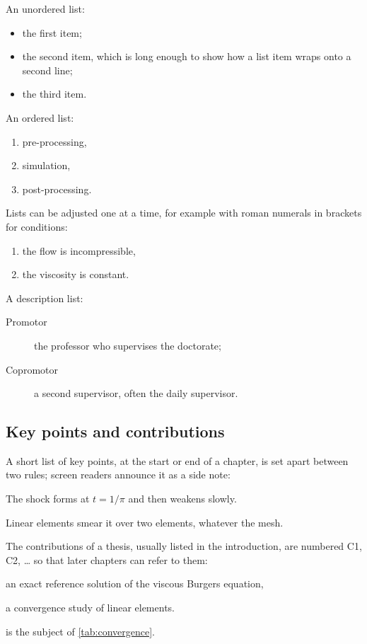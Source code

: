An unordered list:
\begin{itemize}
    \item the first item;
    \item the second item, which is long enough to show how a list item wraps onto a second line;
    \item the third item.
\end{itemize}
An ordered list:
\begin{enumerate}
    \item pre-processing,
    \item simulation,
    \item post-processing.
\end{enumerate}
Lists can be adjusted one at a time, for example with roman numerals in brackets for conditions:
\begin{enumerate}[label=(\roman*), leftmargin=2.1em]
    \item the flow is incompressible,
    \item the viscosity is constant.
\end{enumerate}
A description list:
\begin{description}
    \item[Promotor] the professor who supervises the doctorate;
    \item[Copromotor] a second supervisor, often the daily supervisor.
\end{description}

\subsection{Key points and contributions}

A short list of key points, at the start or end of a chapter, is set apart between two rules; screen readers announce it as a side note:
\begin{keypoints}
    \item The shock forms at $t = 1/\pi$ and then weakens slowly.
    \item Linear elements smear it over two elements, whatever the mesh.
\end{keypoints}
The contributions of a thesis, usually listed in the introduction, are numbered C1, C2, \ldots{} so that later chapters can refer to them:
\begin{contributions}
    \item an exact reference solution of the viscous Burgers equation, \label{c:exact}
    \item a convergence study of linear elements. \label{c:convergence}
\end{contributions}
 is the subject of \cref{tab:convergence}.

